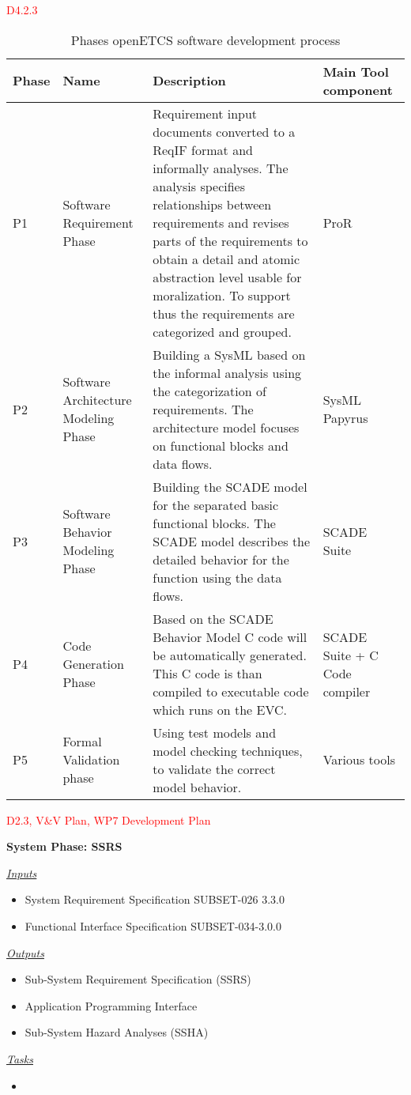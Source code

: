 \documentclass{template/openetcs_article}
\begin{document}
\textcolor{red}{D4.2.3}
\begin{table}[htbp]
  \centering
  
  \caption{Phases openETCS software development process}
\begin{tabular}{|p{1cm}|p{2cm}|p{7.5cm}|p{2.5cm}|}
\hline \textbf{Phase} & \textbf{Name} & \textbf{Description} & \textbf{Main Tool component} \\ 
\hline P1 & Software Requirement Phase & Requirement input documents converted to a ReqIF format and informally analyses. The analysis specifies relationships between requirements and revises parts of the requirements to obtain a detail and atomic abstraction level usable for moralization. To support thus the requirements are categorized and grouped. & ProR \\ 
\hline P2 & Software Architecture Modeling Phase & Building a SysML based on the informal analysis using the categorization of requirements. The architecture model focuses on functional blocks and data flows. & SysML Papyrus \\ 
\hline P3 & Software Behavior Modeling Phase & Building the SCADE model for the separated basic functional blocks. The SCADE model describes the detailed behavior for the function using the data flows. & SCADE Suite \\ 
\hline P4 & Code Generation Phase & Based on the SCADE Behavior Model C code will be automatically generated. This C code is than compiled to executable code which runs on the EVC. & SCADE Suite + C Code compiler\\
\hline P5 & Formal Validation phase & Using test models and model checking techniques, to validate the correct model behavior.  & Various tools \\ 
\hline 
\end{tabular} 
\label{tab:DevelopmentPhases}
\end{table}

\textcolor{red}{D2.3, V\&V Plan, WP7 Development Plan}

\begin{description}
\item \textbf{System Phase: SSRS}

\underline{\textit{Inputs}}
\begin{itemize}
\item System Requirement Specification SUBSET-026 3.3.0
\item Functional Interface Specification SUBSET-034-3.0.0
\end{itemize}


\underline{\textit{Outputs}}
\begin{itemize}
\item Sub-System Requirement Specification
(SSRS)
\item Application Programming Interface
\item Sub-System Hazard Analyses (SSHA)
\end{itemize}

\underline{\textit{Tasks}}
\begin{itemize}
\item 
\end{itemize}
\end{description}
\end{document}
